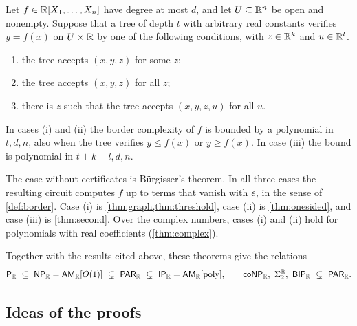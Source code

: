 \begin{maintheorem}\label{thm:F}
Let $f\in\mathbb{R}[X_1,\dots,X_n]$ have degree at most $d$, and let $U\subseteq\mathbb{R}^n$ be open and nonempty. Suppose that a tree of depth $t$ with arbitrary real constants verifies $y=f(x)$ on $U\times\mathbb{R}$ by one of the following conditions, with $z\in\mathbb{R}^k$ and $u\in\mathbb{R}^l$.
\begin{enumerate}[label=\textup{(\roman*)}]
\item the tree accepts $(x,y,z)$ for some $z$;
\item the tree accepts $(x,y,z)$ for all $z$;
\item there is $z$ such that the tree accepts $(x,y,z,u)$ for all $u$.
\end{enumerate}
In cases \textup{(i)} and \textup{(ii)} the border complexity of $f$ is bounded by a polynomial in $t,d,n$, also when the tree verifies $y\le f(x)$ or $y\ge f(x)$. In case \textup{(iii)} the bound is polynomial in $t+k+l,d,n$.
\end{maintheorem}

The case without certificates is B\"urgisser's theorem. In all three cases the resulting circuit computes $f$ up to terms that vanish with $\epsilon$, in the sense of \cref{def:border}. Case (i) is \cref{thm:graph,thm:threshold}, case (ii) is \cref{thm:onesided}, and case (iii) is \cref{thm:second}. Over the complex numbers, cases (i) and (ii) hold for polynomials with real coefficients (\cref{thm:complex}).

Together with the results cited above, these theorems give the relations
\[
\PR\ \subseteq\ \NPR=\AMR[O(1)]\ \subsetneq\ \PARR\ \subsetneq\ \IPR=\AMR[\mathrm{poly}],\qquad
\coNPR,\ \Sigma_2^{\RR},\ \BIPR\ \subsetneq\ \PARR .
\]

\subsection{Ideas of the proofs}

